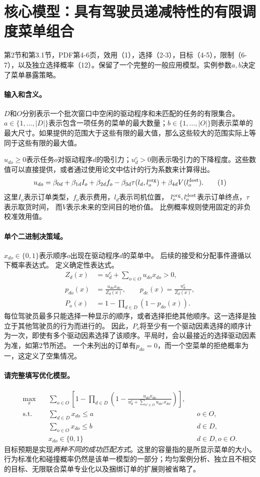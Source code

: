 \documentclass[11pt]{article}
\begin{document}
\section*{核心模型：具有驾驶员递减特性的有限调度菜单组合}
第2节和第3.1节，PDF第4-6页，效用（1），选择（2-3），目标（4-5），限制（6-7），以及独立选择概率（12）。保留了一个完整的一般应用模型。实例参数$a,b$决定了菜单暴露策略。
\paragraph{输入和含义。}
$D$和$O$分别表示一个批次窗口中空闲的驱动程序和未匹配的任务的有限集合。$a\in\{1,\ldots,|D|\}$表示包含一项任务的菜单的最大数量；$b\in\{1,\ldots,|O|\}$则表示菜单的最大尺寸。如果提供的范围大于这些有限的最大值，那么这些较大的范围实际上等同于这些有限的最大值。

$u_{do}\ge0$表示任务$o$对驱动程序$d$的吸引力；$u_d^c>0$则表示吸引力的下降程度。这些数值可以直接提供，或者通过使用论文中估计的行为系数来计算得出。
\[
 u_{do}=\beta_{0d}+\beta_{1d}I_o+\beta_{2d}f_o
 -\beta_{3d}\tau(l_d,l_o^{\rm org})
 +\beta_{4d}V(l_o^{\rm dest}).\tag{1}
\]
这里$I_o$表示订单类型，$f_o$表示费用，$l_d$表示司机位置，
$l_o^{\rm org},l_o^{\rm dest}$表示订单终点，$\tau$表示取货时间，
而$V$表示未来的空间目的地价值。
比例概率规则使用固定的非负校准效用值。
\paragraph{单个二进制决策域。}
$x_{do}\in\{0,1\}$表示顺序$o$出现在驱动程序$d$的菜单中。  
后续的接受和分配事件遵循以下概率表达式。  
定义确定性表达式。
\begin{align*}
 Z_d(x)&=u_d^c+\sum_{o\in O}u_{do}x_{do}>0,\\
 p_{do}(x)&=\frac{u_{do}x_{do}}{Z_d(x)},\qquad
 p_{dc}(x)=\frac{u_d^c}{Z_d(x)},\\
 P_o(x)&=1-\prod_{d\in D}(1-p_{do}(x)).
\end{align*}
每位驾驶员最多只能选择一种显示的顺序，或者选择拒绝其他顺序。这一选择是独立于其他驾驶员的行为而进行的。 因此，$P_o$将至少有一个驱动因素选择的顺序计为一次，即使有多个驱动因素选择了该顺序。平局时，会以最接近的选择驱动因素为准，如第2节所述。
一个未列出的订单有$p_{do}=0$，而一个空菜单的拒绝概率为一，这定义了空集情况。
\paragraph{请完整填写优化模型。}
\begin{align}
\max_{x}\quad &\sum_{o\in O}\left[
1-\prod_{d\in D}\left(1-
\frac{u_{do}x_{do}}{u_d^c+\sum_{o'\in O}u_{do'}x_{do'}}\right)\right],\tag{5/12}\\
\text{s.t.}\quad &\sum_{d\in D}x_{do}\le a &&o\in O,\tag{6}\\
&\sum_{o\in O}x_{do}\le b &&d\in D,\tag{7}\\
&x_{do}\in\{0,1\} &&d\in D,o\in O.\tag{D}
\end{align}
目标预期是实现\emph{两种不同的成功匹配方式}。这里的容量指的是所显示菜单的大小。行为标准化和碰撞概率仍然是该单一模型的一部分；均匀案例分析、独立且不相交的目标、无限联合菜单专业化以及捆绑订单的扩展则被省略了。
\end{document}
